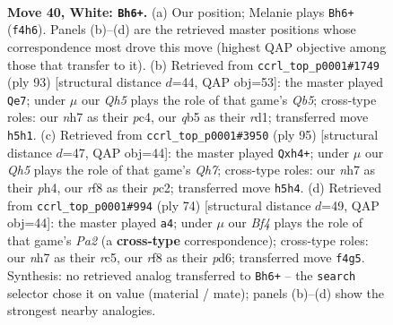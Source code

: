\documentclass[11pt]{article}
\begin{document}
\clearpage

\begin{figure}[p]\centering
\begin{subfigure}{0.46\textwidth}\centering
\resizebox{\linewidth}{!}{%
\newchessgame
\chessboard[
  setfen={5r2/6kn/8/pqp4Q/5B2/1P6/P7/1R4K1 w - - 0 40},
  showmover=false,
  pgfstyle=straightmove, color=movearrow, markmove={f4-h6}
]}
\caption{}
\end{subfigure}\hfill
\begin{subfigure}{0.46\textwidth}\centering
\resizebox{\linewidth}{!}{%
\newchessgame
\chessboard[
  setfen={3r1k2/5p1p/7P/5Q2/1qPp1P2/6K1/8/3R4 b - - 0 47},
  showmover=false,
  pgfstyle=straightmove, color=movearrow, markmove={b4-e7}
]}
\caption{}
\end{subfigure}
\\[4pt]
\begin{subfigure}{0.46\textwidth}\centering
\resizebox{\linewidth}{!}{%
\newchessgame
\chessboard[
  setfen={1r4k1/5p2/3p4/3Q4/K6P/2P5/2P3Pq/4R3 b - - 2 48},
  showmover=false,
  pgfstyle=straightmove, color=movearrow, markmove={h2-h4}
]}
\caption{}
\end{subfigure}\hfill
\begin{subfigure}{0.46\textwidth}\centering
\resizebox{\linewidth}{!}{%
\newchessgame
\chessboard[
  setfen={8/Q5pk/3p3p/2r5/4q3/1P6/P5PP/5R1K w - - 1 38},
  showmover=false,
  pgfstyle=straightmove, color=movearrow, markmove={a2-a4}
]}
\caption{}
\end{subfigure}
\caption{\textbf{Move 40, White: \texttt{Bh6+}.} (a) Our position; Melanie plays \texttt{Bh6+} (\texttt{f4h6}). Panels (b)--(d) are the retrieved master positions whose correspondence most drove this move (highest QAP objective among those that transfer to it). (b) Retrieved from \texttt{ccrl\_top\_p0001\#1749} (ply 93) [structural distance $d$=44, QAP obj=53]: the master played \texttt{Qe7}; under $\mu$ our \emph{Qh5} plays the role of that game's \emph{Qb5}; cross-type roles: our \emph{n}h7 as their \emph{p}c4, our \emph{q}b5 as their \emph{r}d1; transferred move \texttt{h5h1}. (c) Retrieved from \texttt{ccrl\_top\_p0001\#3950} (ply 95) [structural distance $d$=47, QAP obj=44]: the master played \texttt{Qxh4+}; under $\mu$ our \emph{Qh5} plays the role of that game's \emph{Qh7}; cross-type roles: our \emph{n}h7 as their \emph{p}h4, our \emph{r}f8 as their \emph{p}c2; transferred move \texttt{h5h4}. (d) Retrieved from \texttt{ccrl\_top\_p0001\#994} (ply 74) [structural distance $d$=49, QAP obj=44]: the master played \texttt{a4}; under $\mu$ our \emph{Bf4} plays the role of that game's \emph{Pa2} (a \textbf{cross-type} correspondence); cross-type roles: our \emph{n}h7 as their \emph{r}c5, our \emph{r}f8 as their \emph{p}d6; transferred move \texttt{f4g5}. Synthesis: no retrieved analog transferred to \texttt{Bh6+} -- the \texttt{search} selector chose it on value (material / mate); panels (b)--(d) show the strongest nearby analogies.}
\label{fig:thought-m78}
\end{figure}
\end{document}
